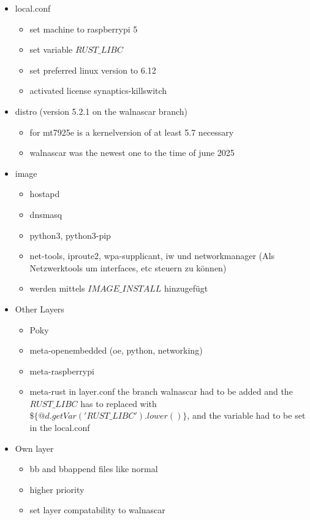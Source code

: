 \begin{itemize}
    \item local.conf \begin{itemize}
        \item set machine to raspberrypi 5
        \item set variable $RUST\_LIBC$
        \item set preferred linux version to 6.12
        \item activated license synaptics-killswitch
    \end{itemize}
    \item distro (version 5.2.1 on the walnascar branch) \begin{itemize}
        \item for mt7925e is a kernelversion of at least 5.7 necessary
        \item walnascar was the newest one to the time of june 2025
    \end{itemize}
    \item image \begin{itemize}
        \item hostapd
        \item dnsmasq
        \item python3, python3-pip
        \item net-tools, iproute2, wpa-supplicant, iw und networkmanager (Als Netzwerktools um interfaces, etc steuern zu können)
        \item werden mittels $IMAGE\_INSTALL$ hinzugefügt
        \end{itemize}
    \item Other Layers \begin{itemize}
        \item Poky
        \item meta-openembedded (oe, python, networking)
        \item meta-raspberrypi
        \item meta-rust in layer.conf the branch walnascar had to be added and the $RUST\_LIBC$ has to replaced with $\$\{@d.getVar('RUST\_LIBC').lower()\}$, and the variable had to be set in the local.conf
    \end{itemize}
    \item Own layer \begin{itemize}
        \item bb and bbappend files like normal
        \item higher priority
        \item set layer compatability to walnascar

\end{itemize}
\end{itemize}
